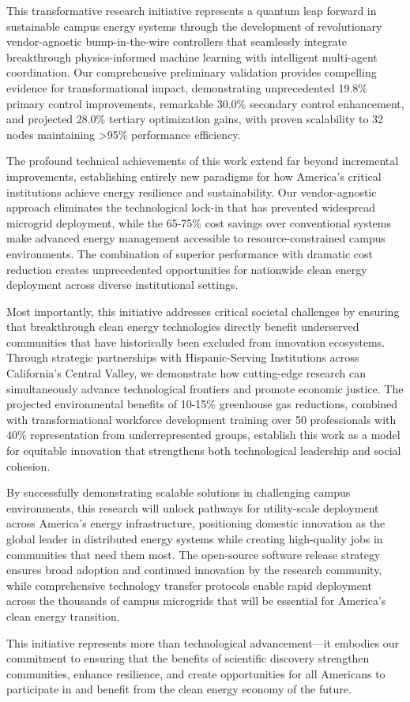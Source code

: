 \documentclass[12pt]{article}
\begin{document}
This transformative research initiative represents a quantum leap forward in sustainable campus energy systems through the development of revolutionary vendor-agnostic bump-in-the-wire controllers that seamlessly integrate breakthrough physics-informed machine learning with intelligent multi-agent coordination. Our comprehensive preliminary validation provides compelling evidence for transformational impact, demonstrating unprecedented 19.8\% primary control improvements, remarkable 30.0\% secondary control enhancement, and projected 28.0\% tertiary optimization gains, with proven scalability to 32 nodes maintaining >95\% performance efficiency.

The profound technical achievements of this work extend far beyond incremental improvements, establishing entirely new paradigms for how America's critical institutions achieve energy resilience and sustainability. Our vendor-agnostic approach eliminates the technological lock-in that has prevented widespread microgrid deployment, while the 65-75\% cost savings over conventional systems make advanced energy management accessible to resource-constrained campus environments. The combination of superior performance with dramatic cost reduction creates unprecedented opportunities for nationwide clean energy deployment across diverse institutional settings.

Most importantly, this initiative addresses critical societal challenges by ensuring that breakthrough clean energy technologies directly benefit underserved communities that have historically been excluded from innovation ecosystems. Through strategic partnerships with Hispanic-Serving Institutions across California's Central Valley, we demonstrate how cutting-edge research can simultaneously advance technological frontiers and promote economic justice. The projected environmental benefits of 10-15\% greenhouse gas reductions, combined with transformational workforce development training over 50 professionals with 40\% representation from underrepresented groups, establish this work as a model for equitable innovation that strengthens both technological leadership and social cohesion.

By successfully demonstrating scalable solutions in challenging campus environments, this research will unlock pathways for utility-scale deployment across America's energy infrastructure, positioning domestic innovation as the global leader in distributed energy systems while creating high-quality jobs in communities that need them most. The open-source software release strategy ensures broad adoption and continued innovation by the research community, while comprehensive technology transfer protocols enable rapid deployment across the thousands of campus microgrids that will be essential for America's clean energy transition.

This initiative represents more than technological advancement---it embodies our commitment to ensuring that the benefits of scientific discovery strengthen communities, enhance resilience, and create opportunities for all Americans to participate in and benefit from the clean energy economy of the future.




\end{document}
